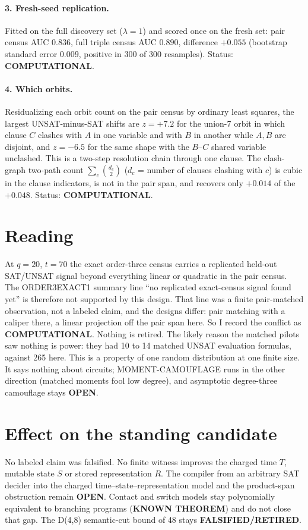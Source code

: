 \documentclass[11pt]{article}
\begin{document}
\paragraph{3. Fresh-seed replication.} Fitted on the full discovery set ($\lambda=1$) and scored once on the fresh set: pair census AUC $0.836$, full triple census AUC $0.890$, difference $+0.055$ (bootstrap standard error $0.009$, positive in 300 of 300 resamples). Status: \textbf{COMPUTATIONAL}.

\paragraph{4. Which orbits.} Residualizing each orbit count on the pair census by ordinary least squares, the largest UNSAT-minus-SAT shifts are $z=+7.2$ for the union-7 orbit in which clause $C$ clashes with $A$ in one variable and with $B$ in another while $A,B$ are disjoint, and $z=-6.5$ for the same shape with the $B$--$C$ shared variable unclashed. This is a two-step resolution chain through one clause. The clash-graph two-path count $\sum_c\binom{d_c}{2}$ ($d_c$ = number of clauses clashing with $c$) is cubic in the clause indicators, is not in the pair span, and recovers only $+0.014$ of the $+0.048$. Status: \textbf{COMPUTATIONAL}.

\section*{Reading}
At $q=20$, $t=70$ the exact order-three census carries a replicated held-out SAT/UNSAT signal beyond everything linear or quadratic in the pair census. The ORDER3EXACT1 summary line ``no replicated exact-census signal found yet'' is therefore not supported by this design. That line was a finite pair-matched observation, not a labeled claim, and the designs differ: pair matching with a caliper there, a linear projection off the pair span here. So I record the conflict as \textbf{COMPUTATIONAL}. Nothing is retired. The likely reason the matched pilots saw nothing is power: they had 10 to 14 matched UNSAT evaluation formulas, against 265 here.
This is a property of one random distribution at one finite size. It says nothing about circuits; MOMENT-CAMOUFLAGE runs in the other direction (matched moments fool low degree), and asymptotic degree-three camouflage stays \textbf{OPEN}.

\section*{Effect on the standing candidate}
No labeled claim was falsified. No finite witness improves the charged time $T$, mutable state $S$ or stored representation $R$. The compiler from an arbitrary SAT decider into the charged time--state--representation model and the product-span obstruction remain \textbf{OPEN}. Contact and switch models stay polynomially equivalent to branching programs (\textbf{KNOWN THEOREM}) and do not close that gap. The D(4,8) semantic-cut bound of 48 stays \textbf{FALSIFIED/RETIRED}.
\end{document}
